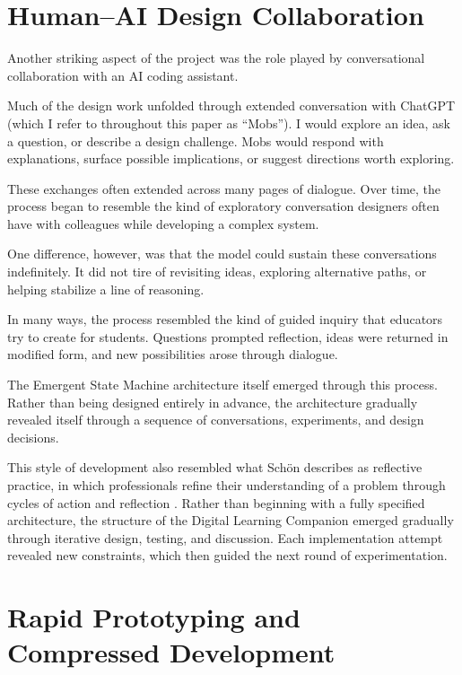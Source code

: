 \documentclass[11pt]{article}
\begin{document}

\section{Human--AI Design Collaboration}

Another striking aspect of the project was the role played by conversational collaboration
with an AI coding assistant.

Much of the design work unfolded through extended conversation with ChatGPT (which I refer to throughout this paper as “Mobs”). I would explore an idea,
ask a question, or describe a design challenge. Mobs would respond with explanations, surface possible implications, or suggest directions worth exploring.

These exchanges often extended across many pages of dialogue. Over time, the process began to resemble the kind of exploratory conversation designers often have with colleagues while developing a complex system.

One difference, however, was that the model could sustain these conversations indefinitely. It did not tire of revisiting ideas, exploring alternative paths,
or helping stabilize a line of reasoning.

In many ways, the process resembled the kind of guided inquiry that educators
try to create for students. Questions prompted reflection, ideas were returned
in modified form, and new possibilities arose through dialogue.

The Emergent State Machine architecture itself emerged through this process. Rather than being designed entirely in advance, the architecture gradually revealed itself through a sequence of conversations, experiments, and design decisions.

This style of development also resembled what Schön describes as reflective
practice, in which professionals refine their understanding of a problem
through cycles of action and reflection \citep{schoen1983}. Rather than
beginning with a fully specified architecture, the structure of the Digital
Learning Companion emerged gradually through iterative design, testing,
and discussion. Each implementation attempt revealed new constraints,
which then guided the next round of experimentation.


\section{Rapid Prototyping and Compressed Development}
\end{document}
